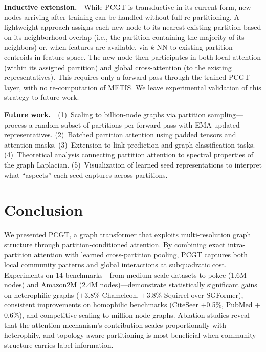 \documentclass[manuscript, screen, review, anonymous]{acmart}
\begin{document}
\textbf{Inductive extension.}~~While PCGT is transductive in its current form, new nodes arriving after training can be handled without full re-partitioning. A lightweight approach assigns each new node to its nearest existing partition based on its neighborhood overlap (i.e., the partition containing the majority of its neighbors) or, when features are available, via $k$-NN to existing partition centroids in feature space. The new node then participates in both local attention (within its assigned partition) and global cross-attention (to the existing representatives). This requires only a forward pass through the trained PCGT layer, with no re-computation of METIS. We leave experimental validation of this strategy to future work.

\textbf{Future work.}~~(1)~Scaling to billion-node graphs via partition sampling---process a random subset of partitions per forward pass with EMA-updated representatives. (2)~Batched partition attention using padded tensors and attention masks. (3)~Extension to link prediction and graph classification tasks. (4)~Theoretical analysis connecting partition attention to spectral properties of the graph Laplacian. (5)~Visualization of learned seed representations to interpret what ``aspects'' each seed captures across partitions.


\section{Conclusion}

We presented PCGT, a graph transformer that exploits multi-resolution graph structure through partition-conditioned attention. By combining exact intra-partition attention with learned cross-partition pooling, PCGT captures both local community patterns and global interactions at subquadratic cost. Experiments on 14 benchmarks---from medium-scale datasets to pokec (1.6M nodes) and Amazon2M (2.4M nodes)---demonstrate statistically significant gains on heterophilic graphs ($+$3.8\% Chameleon, $+$3.8\% Squirrel over SGFormer), consistent improvements on homophilic benchmarks (CiteSeer $+$0.5\%, PubMed $+$0.6\%), and competitive scaling to million-node graphs. Ablation studies reveal that the attention mechanism's contribution scales proportionally with heterophily, and topology-aware partitioning is most beneficial when community structure carries label information.
\end{document}
